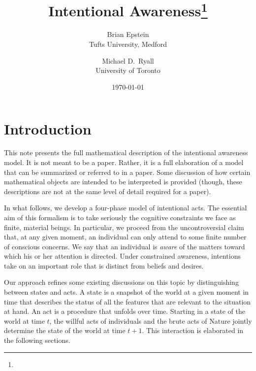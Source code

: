 \documentclass[
11pt,
titlepage,
reqno,
]{article}%
\theoremstyle{definition}
\begin{document}
	
\title{Intentional Awareness\thanks{}
}
\author
{
Brian Epstein \\Tufts University, Medford
\and 
Michael D.\ Ryall \\University of Toronto 
}
\date{\today}
\maketitle
	
	
	
\def\baselinestretch{1.5}\small\normalsize
\newcommand{\ra}[1]{\renewcommand{\arraystretch}{#1}}%
\newpage



\section{Introduction}\label{sec: intro}
This note presents the full mathematical description of the intentional awareness model. 
It is not meant to be a paper.
Rather, it is a full elaboration of a model that can be summarized or referred to in a paper.
Some discussion of how certain mathematical objects are intended to be interpreted is provided (though, these descriptions are not at the same level of detail required for a paper).

In what follows, we develop a four-phase model of intentional acts. 
The essential aim of this formalism is to take seriously the cognitive constraints we face as finite, material beings.
In particular, we proceed from the uncontroversial claim that, at any given moment, an individual can only  attend to some finite number of conscious concerns. 
We say that an individual is \textit{aware} of the matters toward which his or her attention is directed.
Under constrained awareness, intentions take on an important role that is distinct from beliefs and desires.

Our approach refines some existing discussions on this topic by distinguishing between states and acts. 
A state is a snapshot of the world at a given moment in time that describes the status of all the features that are relevant to the situation at hand. 
An act is a procedure that unfolds over time. 
Starting in a state of the world at time $t$, the willful acts of individuals and the brute acts of Nature jointly determine the state of the world at time $t+1$.
This interaction is elaborated in the following sections.
\end{document}
